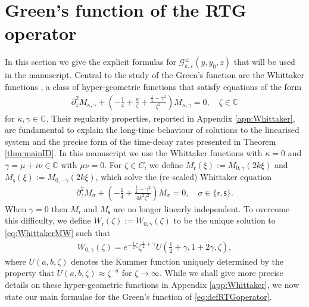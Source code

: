 \documentclass[11pt,reqno]{amsproc}
\theoremstyle{definition}
\numberwithin{equation}{section}
\newcommand{\C}{{\mathbb C}}
\newcommand{\G}{{\mathcal{G}}}
\newcommand{\sr}{{\mathsf{r}}}
\newcommand{\s}{{\mathsf{s}}}
\newcommand{\ep}{\varepsilon}
\begin{document}
\section{Green's function of the RTG operator}\label{sec:Greens}
In this section we give the explicit formulas for $\G_{k,\ep}^\pm(y,y_0,z)$ that will be used in the manuscript. Central to the study of the Green's function are the Whittaker functions \cite{Whittaker03}, a class of  hyper-geometric functions that satisfy equations of the form
\begin{align*}
\partial_z^2 M_{\kappa,\gamma} + \left( - \frac14 + \frac{\kappa}{\zeta} + \frac{\tfrac14 - \gamma^2}{\zeta^2} \right) M_{\kappa,\gamma} = 0, \quad \zeta\in \C
\end{align*}
for $\kappa,\gamma\in \C$. Their regularity properties, reported in Appendix \ref{app:Whittaker}, are fundamental to explain the long-time behaviour of solutions to the linearised system and the precise form of the time-decay rates presented in Theorem \ref{thm:mainID}. In this manuscript we use the Whittaker functions with $\kappa=0$ and $\gamma=\mu+i\nu\in \C$ with $\mu\nu=0$. For $\zeta\in C$, we define $M_\sr(\xi) := M_{0, \gamma}\left( 2k\xi \right)$ and $M_\s(\xi) := M_{0,-\gamma}\left( 2k\xi \right)$, which solve the (re-scaled) Whittaker equation
\begin{align}\label{eq:WhittakerMW}
\partial_z^2 M_{\sigma} + \left( - \frac14 +  \frac{\tfrac14 - \gamma^2}{4k^2\zeta^2} \right) M_{\sigma} = 0, \quad\sigma\in \lbrace \sr, \s \rbrace.
\end{align}
When $\gamma=0$ then $M_\sr$ and $M_\s$ are no longer linearly independent. To overcome this difficulty, we define $W_\sr(\zeta):= W_{0,\gamma}(\zeta)$ to be the unique solution to \eqref{eq:WhittakerMW} such that
\begin{align*}
W_{0,\gamma}(\zeta) = e^{-\frac12\zeta}\zeta^{\frac12+\gamma}U(\tfrac12+\gamma, 1+2\gamma,\zeta),
\end{align*}
where $U(a,b,\zeta)$ denotes the Kummer function uniquely determined by the property that $U(a,b,\zeta) \approx \zeta^{-a}$ for $\zeta\rightarrow\infty$. While we shall give more precise details on these hyper-geometric functions in Appendix \ref{app:Whittaker}, we now state our main formulae for the Green's function of \eqref{eq:defRTGoperator}.
\end{document}
